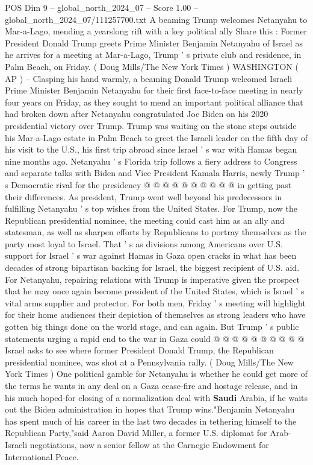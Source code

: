 \begin{textsample}{POS Dim 9 – global\_north\_2024\_07 – Score 1.00 – global\_north\_2024\_07/111257700.txt}  \label{ex:f9_pos_294}
A beaming Trump welcomes Netanyahu to Mar-a-Lago, mending a yearslong rift with a key political ally Share this : Former President Donald Trump greets Prime Minister Benjamin Netanyahu of Israel as he arrives for a meeting at Mar-a-Lago, Trump ' s private club and residence, in Palm Beach, on Friday. ( Doug Mills/The New York Times ) WASHINGTON ( AP ) -- Clasping his hand warmly, a beaming Donald Trump welcomed Israeli Prime Minister Benjamin Netanyahu for their first face-to-face meeting in nearly four years on Friday, as they sought to mend an important political alliance that had broken down after Netanyahu congratulated Joe Biden on his 2020 presidential victory over Trump.
Trump was waiting on the stone steps outside his Mar-a-Lago estate in Palm Beach to greet the Israeli leader on the fifth day of his visit to the U.S., his first trip abroad since Israel ' s war with Hamas began nine months ago.
Netanyahu ' s Florida trip follows a fiery address to Congress and separate talks with Biden and Vice President Kamala Harris, newly Trump ' s Democratic rival for the presidency @ @ @ @ @ @ @ @ @ @ in getting past their differences.
As president, Trump went well beyond his predecessors in fulfilling Netanyahu ' s top wishes from the United States.
For Trump, now the Republican presidential nominee, the meeting could cast him as an ally and statesman, as well as sharpen efforts by Republicans to portray themselves as the party most loyal to Israel.
That ' s as divisions among Americans over U.S. support for Israel ' s war against Hamas in Gaza open cracks in what has been decades of strong bipartisan backing for Israel, the biggest recipient of U.S. aid.
For Netanyahu, repairing relations with Trump is imperative given the prospect that he may once again become president of the United States, which is Israel ' s vital arms supplier and protector.
For both men, Friday ' s meeting will highlight for their home audiences their depiction of themselves as strong leaders who have gotten big things done on the world stage, and can again.
But Trump ' s public statements urging a rapid end to the war in Gaza could @ @ @ @ @ @ @ @ @ @ Israel asks to see where former President Donald Trump, the Republican presidential nominee, was shot at a Pennsylvania rally. ( Doug Mills/The New York Times ) One political gamble for Netanyahu is whether he could get more of the terms he wants in any deal on a Gaza cease-fire and hostage release, and in his much hoped-for closing of a normalization deal with \textbf{Saudi} Arabia, if he waits out the Biden administration in hopes that Trump wins."Benjamin Netanyahu has spent much of his career in the last two decades in tethering himself to the Republican Party,"said Aaron David Miller, a former U.S. diplomat for Arab-Israeli negotiations, now a senior fellow at the Carnegie Endowment for International Peace.

\end{textsample}
